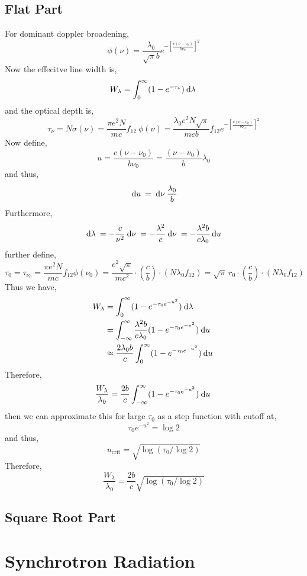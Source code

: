 \documentclass[11pt, a4paper]{article}
\begin{document}
\subsection{Flat Part}

For dominant doppler broadening,
\[ \phi(\nu) = \frac{\lambda_0}{\sqrt{\pi} b} e^{-\left[ \frac{c(\nu - \nu_0)}{b \nu_0} \right]^2} \]
Now the effecitve line width is,
\[ W_\lambda = \int_{0}^\infty (1 - e^{-\tau_\nu}) \: \mathrm{d}\lambda \: \]
and the optical depth is,
\[ \tau_\nu = N \sigma(\nu) = \frac{\pi e^2 N}{mc} f_{12} \: \phi(\nu) = \frac{\lambda_0 e^2 N \sqrt{\pi}}{mc b} f_{12} e^{-\left[ \frac{c(\nu - \nu_0)}{b \nu_0} \right]^2} \]
Now define,
\[ u = \frac{c(\nu - \nu_0)}{b \nu_0} = \frac{(\nu - \nu_0)}{b} \lambda_0 \]
and thus, 
\[ \: \mathrm{d}u \: = \: \mathrm{d}\nu \: \frac{\lambda_0}{b} \]
Furthermore,
\[ \: \mathrm{d}\lambda \: = - \frac{c}{\nu^2} \: \mathrm{d}\nu \: = - \frac{\lambda^2}{c} \: \mathrm{d}\nu \: = - \frac{\lambda^2 b}{c \lambda_0} \: \mathrm{d}u \: \]
further define,
\[ \tau_0 = \tau_{\nu_0} = \frac{\pi e^2 N}{mc} f_{12} \phi(\nu_0) = \frac{e^2 \sqrt{\pi}}{m c^2} \cdot \left( \frac{c}{b} \right) \cdot (N \lambda_0 f_{12}) = \sqrt{\pi} \: r_0 \cdot \left( \frac{c}{b} \right) \cdot (N \lambda_0 f_{12})  \]
Thus we have,
\begin{align*}
W_\lambda & = \int_{0}^{\infty} (1 - e^{-\tau_0 e^{-u^2}}) \: \mathrm{d}\lambda \: 
\\
& = \int_{-\infty}^{\infty} \frac{\lambda^2 b}{c \lambda_0} (1 - e^{-\tau_0 e^{-u^2}}) \: \mathrm{d}u \:
\\
& \approx \frac{2 \lambda_0 b}{c} \int_{0}^{\infty}  (1 - e^{-\tau_0 e^{-u^2}}) \: \mathrm{d}u \:
\end{align*}
Therefore,
\[ \frac{W_\lambda}{\lambda_0} = \frac{2 b}{c} \int_{-\infty}^{\infty}  (1 - e^{-\tau_0 e^{-u^2}}) \: \mathrm{d}u \: \]
then we can approximate this for large $\tau_0$ as a step function with cutoff at,
\[ \tau_0 e^{-u^2} = \log{2} \]
and thus,
\[ u_{\text{crit}} = \sqrt{\log{(\tau_0 / \log{2})}} \]
Therefore,
\[ \frac{W_\lambda}{\lambda_0} = \frac{2 b}{c} \sqrt{\log{(\tau_0 / \log{2})}} \]

\subsection{Square Root Part}

\section{Synchrotron Radiation}
\end{document}
